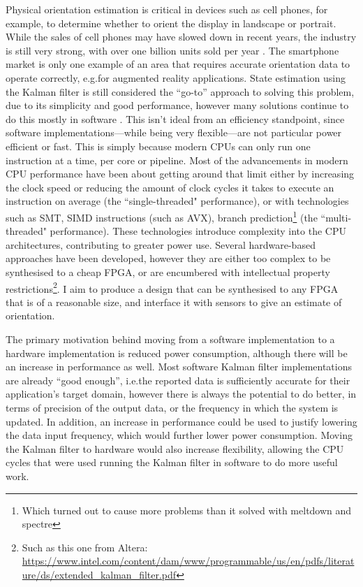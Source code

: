 \documentclass[12pt]{article}
\begin{document}
Physical orientation estimation is critical in devices such as cell phones, for example, to determine whether to orient the display in landscape or portrait. While the sales of cell phones may have slowed down in recent years, the industry is still very strong, with over one billion units sold per year \cite{Mongardini_2020}. The smartphone market is only one example of an area that requires accurate orientation data to operate correctly, e.g.\@ for augmented reality applications. State estimation using the Kalman filter is still considered the ``go-to'' approach to solving this problem, due to its simplicity and good performance, however many solutions continue to do this mostly in software \cite{ayub_2012}. This isn't ideal from an efficiency standpoint, since software implementations---while being very flexible---are not particular power efficient or fast. This is simply because modern CPUs can only run one instruction at a time, per core or pipeline. Most of the advancements in modern CPU performance have been about getting around that limit either by increasing the clock speed or reducing the amount of clock cycles it takes to execute an instruction on average (the ``single-threaded" performance), or with technologies such as SMT, SIMD instructions (such as AVX), branch prediction\footnote{Which turned out to cause more problems than it solved with meltdown and spectre} (the ``multi-threaded" performance). These technologies introduce complexity into the CPU architectures, contributing to greater power use. Several hardware-based approaches have been developed, however they are either too complex \cite{mills_2016} to be synthesised to a cheap FPGA, or are encumbered with intellectual property restrictions\footnote{Such as this one from Altera: \url{https://www.intel.com/content/dam/www/programmable/us/en/pdfs/literature/ds/extended_kalman_filter.pdf}}. I aim to produce a design that can be synthesised to any FPGA that is of a reasonable size, and interface it with sensors to give an estimate of orientation.

The primary motivation behind moving from a software implementation to a hardware implementation is reduced power consumption, although there will be an increase in performance as well. Most software Kalman filter implementations are already ``good enough'', i.e.\@ the reported data is sufficiently accurate for their application's target domain, however there is always the potential to do better, in terms of precision of the output data, or the frequency in which the system is updated. In addition, an increase in performance could be used to justify lowering the data input frequency, which would further lower power consumption. Moving the Kalman filter to hardware would also increase flexibility, allowing the CPU cycles that were used running the Kalman filter in software to do more useful work.
\end{document}
